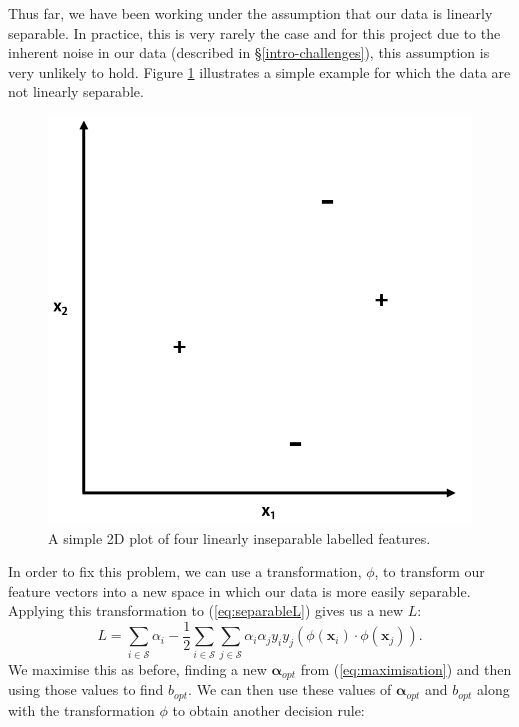 \documentclass[12pt,a4paper,twoside,openright]{report}
\begin{document}
Thus far, we have been working under the assumption that our data is linearly separable. In practice, this is very rarely the case and for this project due to the inherent noise in our data (described in \S \ref{intro-challenges}), this assumption is very unlikely to hold. Figure \ref{fig:inseparable} illustrates a simple example for which the data are not linearly separable.
\begin{figure}
	\begin{center}
		\includegraphics[scale=0.6]{figs/inseparable.png}
	\end{center}
	\caption{A simple 2D plot of four linearly inseparable labelled features.}
	\label{fig:inseparable}
\end{figure}
\newline
\newline
In order to fix this problem, we can use a transformation, $\phi$, to transform our feature vectors into a new space in which our data is more easily separable. Applying this transformation to (\ref{eq:separableL}) gives us a new $L$:
\begin{equation} \label{eq:phiL}
	L = \sum_{i \in \mathcal{S}} \alpha_i - \frac{1}{2}\sum_{i \in \mathcal{S}} \sum_{j \in \mathcal{S}} \alpha_i \alpha_j y_i y_j (\phi (\mathbf{x}_i) \cdot \phi (\mathbf{x}_j)).
\end{equation}
We maximise this as before, finding a new $\boldsymbol{\alpha}_{opt}$ from (\ref{eq:maximisation}) and then using those values to find $b_{opt}$. We can then use these values of $\boldsymbol{\alpha}_{opt}$ and $b_{opt}$ along with the transformation $\phi$ to obtain another decision rule:
\end{document}
